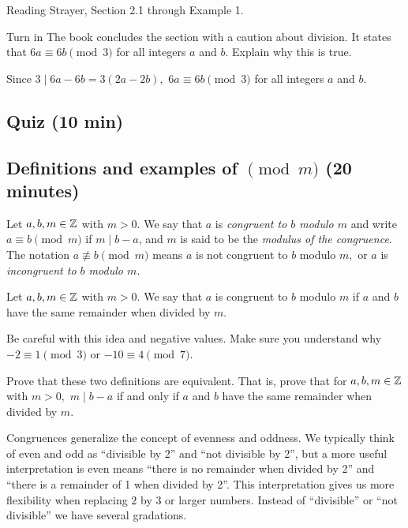 \documentclass[letterpaper, 11 pt]{ximera}
\begin{document}
\begin{pre}
    \item[Reading] Strayer, Section 2.1 through Example 1.
    \item[Turn in] The book concludes the section with a caution about division. It states that $6a\equiv 6b \pmod 3$ for all integers $a$ and $b$. Explain why this is true.
    
    
    \begin{solution}
        Since $3\mid 6a-6b=3(2a-2b),$ $6a\equiv 6b \pmod 3$ for all integers $a$ and $b$.
    \end{solution}
    \end{pre}

\subsection{Quiz (10 min)}

\subsection{Definitions and examples of $\pmod m$ (20 minutes)}

\begin{defn} Let $a,b,m\in\mathbb Z$ with $m>0.$
We say that $a$ is \emph{congruent to $b$ modulo $m$} and write $a \equiv b \pmod{m}$ if $m\mid b-a$, and $m$ is said to be the \emph{modulus of the congruence}. The notation $a\not\equiv b\pmod m$ means $a$ is not congruent to $b$ modulo $m,$ or $a$ is \emph{incongruent to $b$ modulo $m$.} 
\end{defn}

\begin{defn} Let $a,b,m\in\mathbb Z$ with $m>0.$ We say that $a$ is congruent to $b$ modulo $m$ if $a$ and $b$ have the same remainder when divided by $m$. 
\end{defn}
Be careful with this idea and negative values. Make sure you understand why $-2\equiv 1\pmod{3}$ or $-10\equiv 4\pmod{7}$.

\begin{tps}
Prove that these two definitions are equivalent. That is, prove that for $a,b,m\in\mathbb Z$ with $m>0,$ $m\mid b-a$ if and only if $a$ and $b$ have the same remainder when divided by $m$.
\end{tps}

Congruences generalize the concept of evenness and oddness. We typically think of even and odd as ``divisible by 2'' and ``not divisible by 2'', but a more useful interpretation is even means ``there is no remainder when divided by 2'' and ``there is a remainder of 1 when divided by 2''. This interpretation gives us more flexibility when replacing $2$ by $3$ or larger numbers. Instead of ``divisible'' or ``not divisible'' we have several gradations.
\end{document}
